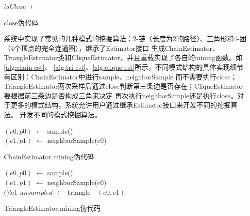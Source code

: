 \documentclass[master]{thesis-uestc}
\begin{document}
\begin{algorithm}[H]
    $isClose$ $\leftarrow$ 
    \caption{close伪代码}
    \label{alg:close}
\end{algorithm}

    系统中实现了常见的几种模式的挖掘算法：2-链（长度为2的路径）、三角形和4-团（4个顶点的完全连通图），继承了Estimator接口
生成ChainEstimator、TriangleEstimator类和CliqueEstimator，并且重载实现了各自的mining函数。如\ref{alg:chain-est}、
\ref{alg:tri-est}、\ref{alg:clique-est}所示，不同模式结构的具体实现细节有区别：ChainEstimator中进行sample、neighborSample
而不需要执行close；TriangleEstimator两次采样后通过close判断第三条边是否存在；CliqueEstimator要根据前三条边是否构成三角来决定
再次执行neighborSample还是执行close。对于更多的模式结构，系统允许用户通过继承Estimator接口来开发不同的挖掘算法。
开发不同的模式挖掘算法。

\begin{algorithm}[H]
    $(e0, p0)$ $\leftarrow$ sample()\\
    $(e1, p1)$ $\leftarrow$ neighborSample($e0$)\\
    \caption{ChainEstimator.mining伪代码}
    \label{alg:chain-est}
\end{algorithm}

\begin{algorithm}[H]
    $(e0, p0)$ $\leftarrow$ sample()\\
    $(e1, p1)$ $\leftarrow$ neighborSample($e0$)\\
    \If(){!e1}{
    }
    $unsampled$ $\leftarrow$  triangle - $(e0, e1)$\\
    \caption{TriangleEstimator.mining伪代码}
    \label{alg:tri-est}
\end{algorithm}
\end{document}
